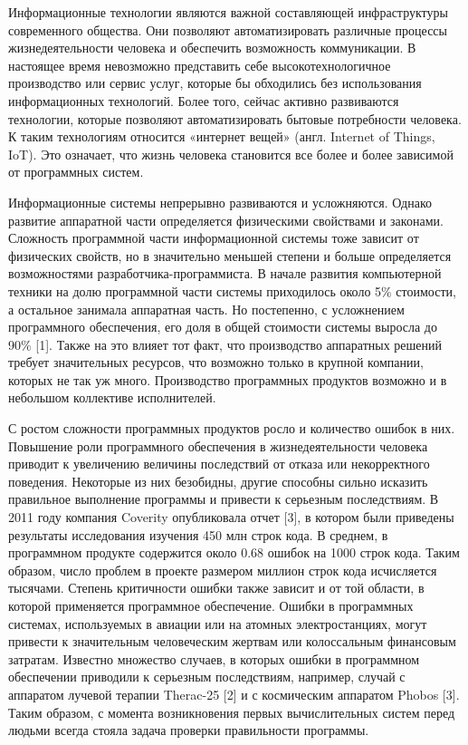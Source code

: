 
{\actuality} Информационные технологии являются важной составляющей инфраструктуры современного общества. Они позволяют автоматизировать различные процессы жизнедеятельности человека и обеспечить возможность коммуникации. В настоящее время невозможно представить себе высокотехнологичное производство или сервис услуг, которые бы обходились без использования информационных технологий. Более того, сейчас активно развиваются технологии, которые позволяют автоматизировать бытовые потребности человека. К таким технологиям относится «интернет вещей» (англ. Internet of Things, IoT). Это означает, что жизнь человека становится все более и более зависимой от программных систем.

Информационные системы непрерывно развиваются и усложняются. Однако развитие аппаратной части определяется физическими свойствами и законами. Сложность программной части информационной системы тоже зависит от физических свойств, но в значительно меньшей степени и больше определяется возможностями разработчика-программиста. В начале развития компьютерной техники на долю программной части системы приходилось около 5\% стоимости, а остальное занимала аппаратная часть. Но постепенно, с усложнением программного обеспечения, его доля в общей стоимости системы выросла до 90\% [1]. Также на это влияет тот факт, что производство аппаратных решений требует значительных ресурсов, что возможно только в крупной компании, которых не так уж много. Производство программных продуктов возможно и в небольшом коллективе исполнителей. 

С ростом сложности программных продуктов росло и количество ошибок в них. Повышение роли программного обеспечения в жизнедеятельности человека приводит к увеличению величины последствий от отказа или некорректного поведения. Некоторые из них безобидны, другие способны сильно исказить правильное выполнение программы и привести к серьезным последствиям. В 2011 году компания Coverity опубликовала отчет [3], в котором были приведены результаты исследования изучения 450 млн строк кода. В среднем, в программном продукте содержится около 0.68 ошибок на 1000 строк кода. Таким образом, число проблем в проекте размером миллион строк кода исчисляется тысячами. Степень критичности ошибки также зависит и от той области, в которой применяется программное обеспечение. Ошибки в программных системах, используемых в авиации или на атомных электростанциях, могут привести к значительным человеческим жертвам или колоссальным финансовым затратам. Известно множество случаев, в которых ошибки в программном обеспечении приводили к серьезным последствиям, например, случай с аппаратом лучевой терапии Therac-25 [2] и с космическим аппаратом Phobos [3]. Таким образом, с момента возникновения первых вычислительных систем перед людьми всегда стояла задача проверки правильности программы. 

